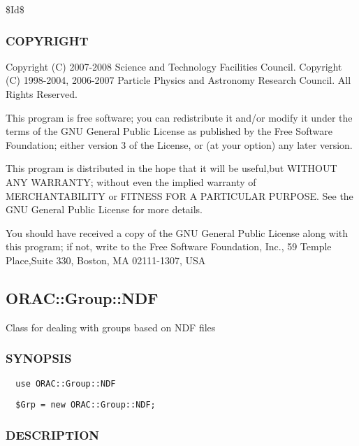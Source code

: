 \$Id\$

\subsubsection*{COPYRIGHT\label{ORAC::Group_COPYRIGHT}}


Copyright (C) 2007-2008 Science and Technology Facilities Council.
Copyright (C) 1998-2004, 2006-2007 Particle Physics and Astronomy Research
Council. All Rights Reserved.



This program is free software; you can redistribute it and/or modify it under
the terms of the GNU General Public License as published by the Free Software
Foundation; either version 3 of the License, or (at your option) any later
version.



This program is distributed in the hope that it will be useful,but WITHOUT ANY
WARRANTY; without even the implied warranty of MERCHANTABILITY or FITNESS FOR A
PARTICULAR PURPOSE. See the GNU General Public License for more details.



You should have received a copy of the GNU General Public License along with
this program; if not, write to the Free Software Foundation, Inc., 59 Temple
Place,Suite 330, Boston, MA  02111-1307, USA

\subsection{ORAC::Group::NDF\label{ORAC::Group::NDF}}


Class for dealing with groups based on NDF files

\subsubsection*{SYNOPSIS\label{ORAC::Group::NDF_SYNOPSIS}}
\begin{verbatim}
  use ORAC::Group::NDF
\end{verbatim}
\begin{verbatim}
  $Grp = new ORAC::Group::NDF;
\end{verbatim}
\subsubsection*{DESCRIPTION\label{ORAC::Group::NDF_DESCRIPTION}}


